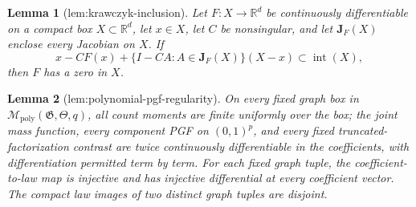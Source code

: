 \documentclass{article}
\newtheorem{lemma}{Lemma}
\begin{document}
\begin{lemma}[lem:krawczyk-inclusion]\label{lem:krawczyk-inclusion}
Let \(F:X\to\mathbb R^d\) be continuously differentiable on a compact box \(X\subset\mathbb R^d\), let \(x\in X\), let \(C\) be nonsingular, and let \(\boldsymbol J_F(X)\) enclose every Jacobian on \(X\).  If
\[
x-CF(x)+\{I-C A:A\in\boldsymbol J_F(X)\}(X-x)
\subset\operatorname{int}(X),
\]
then \(F\) has a zero in \(X\).
\end{lemma}

\begin{lemma}[lem:polynomial-pgf-regularity]\label{lem:polynomial-pgf-regularity}
On every fixed graph box in \(\mathcal M_{\mathrm{poly}}(\mathfrak G,\Theta,q)\), all count moments are finite uniformly over the box; the joint mass function, every component PGF on \((0,1)^p\), and every fixed truncated-factorization contrast are twice continuously differentiable in the coefficients, with differentiation permitted term by term.  For each fixed graph tuple, the coefficient-to-law map is injective and has injective differential at every coefficient vector.  The compact law images of two distinct graph tuples are disjoint.
\end{lemma}
\end{document}
